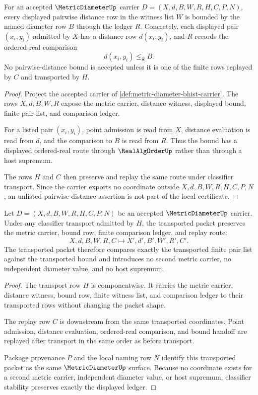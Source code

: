 \begin{theorem}
\label{thm:metric-diameter-bound-obligation}
For an accepted $\MetricDiameterUp$ carrier $D=(X,d,B,W,R,H,C,P,N)$, every displayed pairwise distance row in the witness list $W$ is bounded by the named diameter row $B$ through the ledger $R$. Concretely, each displayed pair $(x_i,y_i)$ admitted by $X$ has a distance row $d(x_i,y_i)$, and $R$ records the ordered-real comparison
$$
d(x_i,y_i)\leq_{\mathsf R} B .
$$
No pairwise-distance bound is accepted unless it is one of the finite rows replayed by $C$ and transported by $H$.
\end{theorem}
\begin{proof}
Project the accepted carrier of \autoref{def:metric-diameter-bhist-carrier}. The rows $X,d,B,W,R$ expose the metric carrier, distance witness, displayed bound, finite pair list, and comparison ledger.

For a listed pair $(x_i,y_i)$, point admission is read from $X$, distance evaluation is read from $d$, and the comparison to $B$ is read from $R$. Thus the bound has a displayed ordered-real route through $\RealAlgOrderUp$ rather than through a host supremum.

The rows $H$ and $C$ then preserve and replay the same route under classifier transport. Since the carrier exports no coordinate outside $X,d,B,W,R,H,C,P,N$, an unlisted pairwise-distance assertion is not part of the local certificate.
\end{proof}

\begin{theorem}
\label{thm:metric-diameter-classifier-stability}
Let $D=(X,d,B,W,R,H,C,P,N)$ be an accepted $\MetricDiameterUp$ carrier. Under any classifier transport admitted by $H$, the transported packet preserves the metric carrier, bound row, finite comparison ledger, and replay route:
$$
X,d,B,W,R,C \longmapsto X',d',B',W',R',C' .
$$
The transported packet therefore compares exactly the transported finite pair list against the transported bound and introduces no second metric carrier, no independent diameter value, and no host supremum.
\end{theorem}
\begin{proof}
The transport row $H$ is componentwise. It carries the metric carrier, distance witness, bound row, finite witness list, and comparison ledger to their transported rows without changing the packet shape.

The replay row $C$ is downstream from the same transported coordinates. Point admission, distance evaluation, ordered-real comparison, and bound handoff are replayed after transport in the same order as before transport.

Package provenance $P$ and the local naming row $N$ identify this transported packet as the same $\MetricDiameterUp$ surface. Because no coordinate exists for a second metric carrier, independent diameter value, or host supremum, classifier stability preserves exactly the displayed ledger.
\end{proof}

